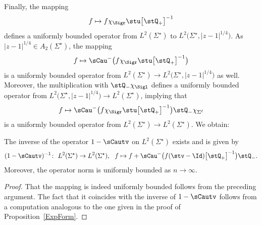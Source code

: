 Finally, the mapping
\begin{align*}
 f \mapsto f\chi_{\Sigr} \stu \big[\stQ_+\big]^{-1}
\end{align*}
defines a uniformly bounded operator from $L^2(\Sigma^\star)$ to $L^2\big(\Sigma^\star, |z-1|^{1/4}\big)$. As $|z-1|^{1/4} \in A_2(\Sigma^\star)$, the mapping
\begin{align*}
 f \mapsto \sCau^-\big(f\chi_{\Sigr} \stu \big[\stQ_+\big]^{-1}\big)
\end{align*}
is a uniformly bounded operator from $L^2(\Sigma^\star) \to L^2\big(\Sigma^\star, |z-1|^{1/4} \big)$ as well. Moreover, the multiplication with $\stQ_-\chi_{\Sigl}$ defines a uniformly bounded operator from $L^2\big(\Sigma^\star, |z-1|^{1/4}\big) \to L^2(\Sigma^\star)$, implying that
\begin{align*}
 f \mapsto \sCau^-\big(f\chi_{\Sigr} \stu \big[\stQ_+\big]^{-1}\big)\stQ_-\chi_{\Sigma^\ell}
\end{align*}
is a uniformly bounded operator from $L^2(\Sigma^\star)\to L^2(\Sigma^\star)$. We obtain:
\begin{Theorem}\label{UniformBoundedness}
The inverse of the operator $1-\sCautv$ on $L^2(\Sigma^\star)$ exists and is given by
\begin{align*}
 (1-\sCautv)^{-1} \colon\ L^2(\Sigma^\star) \to L^2(\Sigma^\star), \ \ f \mapsto f + \sCau^-\big(f (\stv-\Id)\big[\stQ_+\big]^{-1}\big)\stQ_-.
\end{align*}
Moreover, the operator norm is uniformly bounded as $n \to \infty$.
\end{Theorem}
\begin{proof}
That the mapping is indeed uniformly bounded follows from the preceding argument. The fact that it coincides with the inverse of $1-\sCautv$ follows from a computation analogous to the one given in the proof of Proposition~\ref{ExpForm}.
\end{proof}

